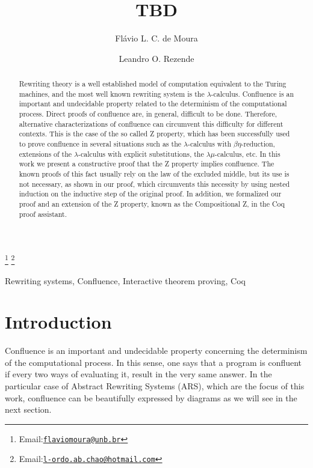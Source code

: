 \documentclass{entcs}
\begin{document}
\begin{frontmatter}
  \title{TBD}
  \author{Flávio L. C. de Moura}
  \author{Leandro O. Rezende}
  \address{Departamento de Ciência da Computação, Universidade de Brasília, Brasília, Brazil}
  \thanks[flaviomoura]{Email:\href{flaviomoura@unb.br}{\texttt{\normalshape flaviomoura@unb.br}}} 
  \thanks[leandro]{Email:\href{l-ordo.ab.chao@hotmail.com}{\texttt{\normalshape l-ordo.ab.chao@hotmail.com}}}
  
\begin{abstract}
  Rewriting theory is a well established model of computation
  equivalent to the Turing machines, and the most well known rewriting
  system is the $\lambda$-calculus. Confluence is an important and
  undecidable property related to the determinism of the computational
  process. Direct proofs of confluence are, in general, difficult to
  be done. Therefore, alternative characterizations of confluence can
  circumvent this difficulty for different contexts. This is the case
  of the so called Z property, which has been successfully used to
  prove confluence in several situations such as the
  $\lambda$-calculus with $\beta\eta$-reduction, extensions of the
  $\lambda$-calculus with explicit substitutions, the
  $\lambda\mu$-calculus, etc. In this work we present a constructive
  proof that the Z property implies confluence. The known proofs of
  this fact usually rely on the law of the excluded middle, but its use is not necessary, 
  as shown in our proof, which circumvents this necessity by using nested induction 
  on the inductive step of the original proof. 
  In addition, we formalized our proof and an extension of the Z
  property, known as the Compositional Z, in the Coq proof assistant.
\end{abstract}

\begin{keyword}
  Rewriting systems, Confluence, Interactive theorem proving, Coq
\end{keyword}
\end{frontmatter}

\section{Introduction}



Confluence is an important and undecidable property concerning the
determinism of the computational process. In this sense, one says that
a program is confluent if every two ways of evaluating it, result in
the very same answer. In the particular case of Abstract Rewriting
Systems (ARS), which are the focus of this work, confluence can be
beautifully expressed by diagrams as we will see in the next section.
\end{document}

